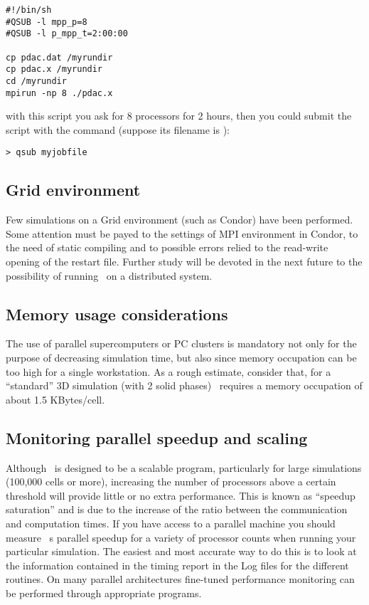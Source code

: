 \begin{verbatim}
#!/bin/sh
#QSUB -l mpp_p=8
#QSUB -l p_mpp_t=2:00:00

cp pdac.dat /myrundir
cp pdac.x /myrundir
cd /myrundir
mpirun -np 8 ./pdac.x
\end{verbatim}

with this script you ask for 8 processors for 2 hours, then
you could submit the script with the command
(suppose its filename is ):

\begin{verbatim}
> qsub myjobfile
\end{verbatim}

\subsection{Grid environment}

Few simulations on a Grid environment (such as Condor) have been performed.
Some attention must be payed to the settings of MPI environment in Condor,
to the need of static compiling and to possible errors relied to the
read-write opening of the restart file. Further study will be devoted in
the next future to the possibility of running \PDAC\ on a distributed
system.

\subsection{Memory usage considerations}
The use of parallel supercomputers or PC clusters is mandatory not only
for the purpose of decreasing simulation time, but also since memory
occupation can be too high for a single workstation. As a rough estimate,
consider that, for a ``standard'' 3D simulation (with 2 solid phases) 
\PDAC\ requires a memory occupation of about 1.5 KBytes/cell. 

\subsection{Monitoring parallel speedup and scaling}

Although \PDAC\ is designed to be a scalable program, particularly for
large simulations (100,000 cells or more), increasing the number of
processors above a certain threshold will provide little or no extra performance.
This is known as ``speedup saturation'' and is
due to the increase of the ratio between the communication and computation
times. If you have access to a parallel machine you should
measure \PDAC\ s parallel speedup for a variety of processor counts when
running your particular simulation. The easiest and most accurate way
to do this is to look at the information contained in the timing report
in the Log files for the different routines. On many parallel architectures
fine-tuned performance monitoring can be performed through appropriate programs.
